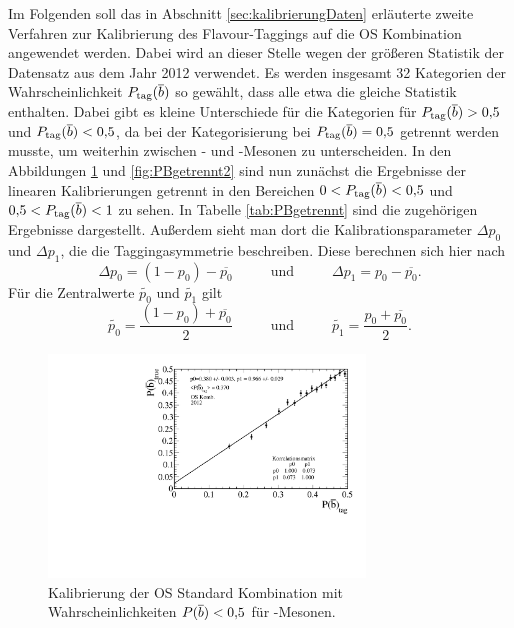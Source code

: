 Im Folgenden soll das in Abschnitt \ref{sec:kalibrierungDaten} erläuterte zweite Verfahren zur Kalibrierung des Flavour-Taggings auf die OS Kombination angewendet werden. Dabei wird an dieser Stelle wegen der größeren Statistik der Datensatz aus dem Jahr \num{2012} verwendet. Es werden insgesamt \num{32} Kategorien der Wahrscheinlichkeit $P_\text{tag}({\overline {{b}}})$ so gewählt, dass alle etwa die gleiche Statistik enthalten. Dabei gibt es kleine Unterschiede für die Kategorien für $P_\text{tag}({\overline {{b}}})>0{,}5$ und $P_\text{tag}({\overline {{b}}})<0{,}5$, da bei der Kategorisierung bei $P_\text{tag}({\overline {{b}}})=0{,}5$ getrennt werden musste, um weiterhin zwischen \Bz- und \Bzb-Mesonen zu unterscheiden. In den Abbildungen \ref{fig:PBgetrennt1} und \ref{fig:PBgetrennt2} sind nun zunächst die Ergebnisse der linearen Kalibrierungen getrennt in den Bereichen $0<P_\text{tag}({\overline {{b}}})<0{,}5$ und $0{,}5<P_\text{tag}({\overline {{b}}})<1$ zu sehen. In Tabelle \ref{tab:PBgetrennt} sind die zugehörigen Ergebnisse dargestellt. Außerdem sieht man dort die Kalibrationsparameter $\Delta p_0$ und $\Delta p_1$, die die Taggingasymmetrie beschreiben. Diese berechnen sich hier nach
\begin{equation}
\Delta p_0=\left(1-p_0\right)-\overline{p_0}\hspace{1cm}\text{ und }\hspace{1cm}\Delta p_1=p_0-\overline{p_0}.
\end{equation}
Für die Zentralwerte $\widetilde{p_0}$ und $\widetilde{p_1}$ gilt
\begin{equation}
\widetilde{p_0}=\frac{\left(1-p_0\right)+\overline{p_0}}{2}\hspace{1cm}\text{ und }\hspace{1cm}\widetilde{p_1}=\frac{p_0+\overline{p_0}}{2}.
\end{equation}
 \begin{figure}[htbp]
	\centering
		\includegraphics[width=0.75\textwidth]{fig/calibration_Bbar.pdf}
	\caption{Kalibrierung der OS Standard Kombination mit Wahrscheinlichkeiten $P({\overline {{b}}})<0{,}5$ für \Bzb-Mesonen.}
	\label{fig:PBgetrennt1} 
\end{figure} 

